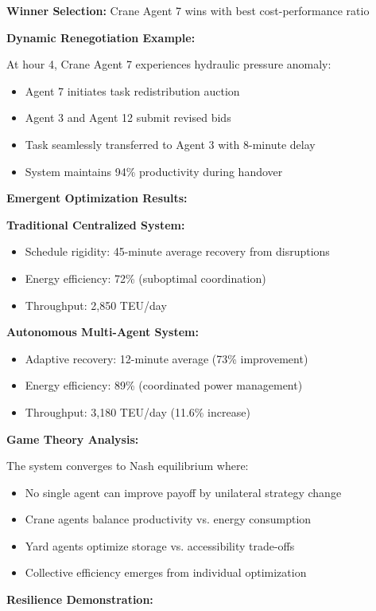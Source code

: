 \documentclass{article}
\begin{document}
\textbf{Winner Selection:} Crane Agent 7 wins with best cost-performance ratio

\textbf{Dynamic Renegotiation Example:}

At hour 4, Crane Agent 7 experiences hydraulic pressure anomaly:
\begin{itemize}
\item Agent 7 initiates task redistribution auction
\item Agent 3 and Agent 12 submit revised bids
\item Task seamlessly transferred to Agent 3 with 8-minute delay
\item System maintains 94\% productivity during handover
\end{itemize}

\textbf{Emergent Optimization Results:}

\textbf{Traditional Centralized System:}
\begin{itemize}
\item Schedule rigidity: 45-minute average recovery from disruptions
\item Energy efficiency: 72\% (suboptimal coordination)
\item Throughput: 2,850 TEU/day
\end{itemize}

\textbf{Autonomous Multi-Agent System:}
\begin{itemize}
\item Adaptive recovery: 12-minute average (73\% improvement)
\item Energy efficiency: 89\% (coordinated power management)
\item Throughput: 3,180 TEU/day (11.6\% increase)
\end{itemize}

\textbf{Game Theory Analysis:}

The system converges to Nash equilibrium where:
\begin{itemize}
\item No single agent can improve payoff by unilateral strategy change
\item Crane agents balance productivity vs. energy consumption
\item Yard agents optimize storage vs. accessibility trade-offs
\item Collective efficiency emerges from individual optimization
\end{itemize}

\textbf{Resilience Demonstration:}
\end{document}
